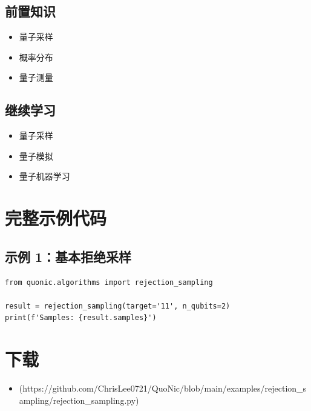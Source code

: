 \documentclass[12pt,a4paper]{article}
\begin{document}
\subsection{前置知识}
\begin{itemize}
  \item 量子采样
  \item 概率分布
  \item 量子测量
\end{itemize}

\subsection{继续学习}
\begin{itemize}
  \item 量子采样
  \item 量子模拟
  \item 量子机器学习
\end{itemize}

\section{完整示例代码}

\subsection{示例 1：基本拒绝采样}

\begin{verbatim}
from quonic.algorithms import rejection_sampling

result = rejection_sampling(target='11', n_qubits=2)
print(f'Samples: {result.samples}')
\end{verbatim}

\section{下载}

\begin{itemize}
  \item [rejection\_sampling.py](https://github.com/ChrisLee0721/QuoNic/blob/main/examples/rejection_sampling/rejection_sampling.py)
\end{itemize}
\end{document}
